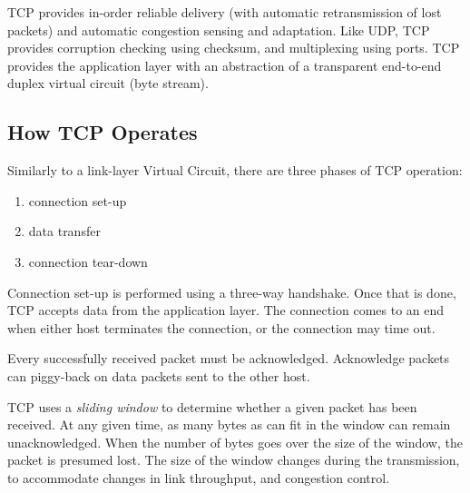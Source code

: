 \documentclass[10pt]{report}
\begin{document}
TCP provides in-order reliable delivery (with automatic retransmission
of lost packets) and automatic congestion sensing and adaptation.  Like
UDP, TCP provides corruption checking using checksum, and multiplexing
using ports.  TCP provides the application layer with an abstraction of
a transparent end-to-end duplex virtual circuit (byte stream).
\cite{rfc1180}

\subsection{How TCP Operates}

Similarly to a link-layer Virtual Circuit, there are three phases of
TCP operation:

\begin{enumerate}
    \item connection set-up
    \item data transfer
    \item connection tear-down
\end{enumerate}

Connection set-up is performed using a three-way handshake.  Once that
is done, TCP accepts data from the application layer.  The connection
comes to an end when either host terminates the connection, or the
connection may time out.

Every successfully received packet must be acknowledged.  Acknowledge
packets can piggy-back on data packets sent to the other host.

TCP uses a {\em sliding window} to determine whether a given packet has
been received.  At any given time, as many bytes as can fit in the
window can remain unacknowledged.  When the number of bytes goes over
the size of the window, the packet is presumed lost.  The size of the
window changes during the transmission, to accommodate changes in
link throughput, and congestion control.




%
%


\thispagestyle{fancy}
\end{document}
